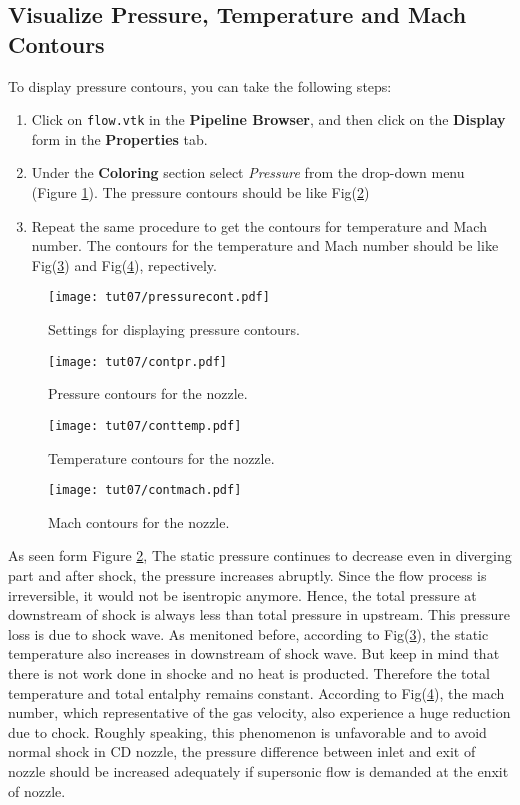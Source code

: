 \subsection{Visualize Pressure, Temperature and Mach Contours}
To display pressure contours, you can take the following steps:
\begin{enumerate}[label=\arabic*)]
	\item Click on \texttt{flow.vtk} in the \textbf{Pipeline Browser}, and then click on the \textbf{Display} form in the \textbf{Properties} tab.
	\item Under the \textbf{Coloring} section select \textit{Pressure} from the drop-down menu (Figure \ref{fig7:pressure contours setting}). The pressure contours should be like Fig(\ref{fig7:plot pressure cont1})
	\item Repeat the same procedure to get the contours for temperature and Mach number. The contours for the temperature and Mach number should be like Fig(\ref{fig7:plot temp cont1}) and Fig(\ref{fig7:plot mach cont1}), repectively.
\end{enumerate}
\begin{figure}[H]
	\centering
	\texttt{[image: tut07/pressurecont.pdf]}
	\caption{Settings for displaying pressure contours.}
	\label{fig7:pressure contours setting}
\end{figure} 
\begin{figure}[ht]
	\centering
	\texttt{[image: tut07/contpr.pdf]}
	\caption{Pressure contours for the nozzle.}
	\label{fig7:plot pressure cont1}
\end{figure}
\begin{figure}[ht]
	\centering
	\texttt{[image: tut07/conttemp.pdf]}
	\caption{Temperature contours for the nozzle.}
	\label{fig7:plot temp cont1}
\end{figure}
\begin{figure}[H]
	\centering
	\texttt{[image: tut07/contmach.pdf]}
	\caption{Mach contours for the nozzle.}
	\label{fig7:plot mach cont1}
\end{figure}

As seen form Figure \ref{fig7:plot pressure cont1}, The static pressure continues to decrease even in diverging part and after shock, the pressure increases abruptly. Since the flow process is irreversible, it would not be isentropic anymore. Hence, the total pressure at downstream of shock is always less than total pressure in upstream. This pressure loss is due to shock wave. As menitoned before, according to Fig(\ref{fig7:plot temp cont1}), the static temperature also increases in downstream of shock wave. But keep in mind that there is not work done in shocke and no heat is producted. Therefore the total temperature and total entalphy remains constant. According to Fig(\ref{fig7:plot mach cont1}), the mach number, which representative of the gas velocity, also experience a huge reduction due to chock. Roughly speaking, this phenomenon is unfavorable and to avoid normal shock in CD nozzle, the pressure difference between inlet and exit of nozzle should be increased adequately if supersonic flow is demanded at the enxit of nozzle.
